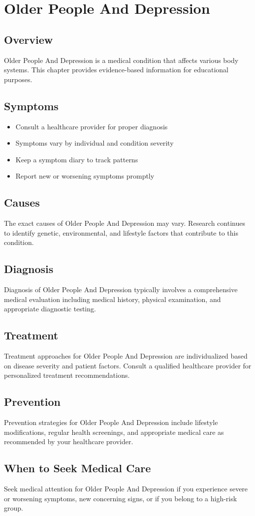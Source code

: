 \chapter{Older People And Depression}

\section*{Overview}
Older People And Depression is a medical condition that affects various body systems. This chapter provides evidence-based information for educational purposes.

\section*{Symptoms}
\begin{itemize}
  \item Consult a healthcare provider for proper diagnosis
  \item Symptoms vary by individual and condition severity
  \item Keep a symptom diary to track patterns
  \item Report new or worsening symptoms promptly
\end{itemize}

\section*{Causes}
The exact causes of Older People And Depression may vary. Research continues to identify genetic, environmental, and lifestyle factors that contribute to this condition.

\section*{Diagnosis}
Diagnosis of Older People And Depression typically involves a comprehensive medical evaluation including medical history, physical examination, and appropriate diagnostic testing.

\section*{Treatment}
Treatment approaches for Older People And Depression are individualized based on disease severity and patient factors. Consult a qualified healthcare provider for personalized treatment recommendations.

\section*{Prevention}
Prevention strategies for Older People And Depression include lifestyle modifications, regular health screenings, and appropriate medical care as recommended by your healthcare provider.

\section*{When to Seek Medical Care}
Seek medical attention for Older People And Depression if you experience severe or worsening symptoms, new concerning signs, or if you belong to a high-risk group.
\clearpage
